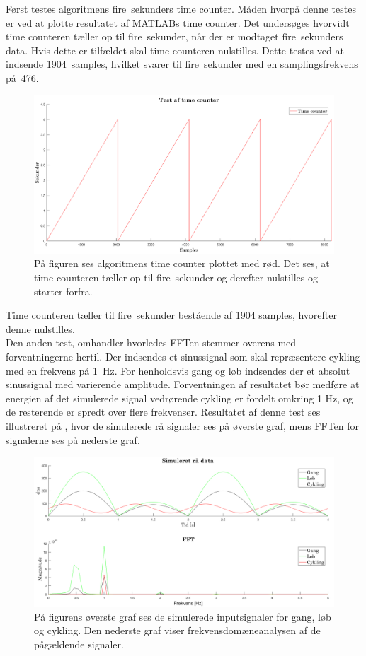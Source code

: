 Først testes algoritmens fire~sekunders time counter. Måden hvorpå denne testes er ved at plotte resultatet af MATLABs time counter. Det undersøges hvorvidt time counteren tæller op til fire~sekunder, når der er modtaget fire~sekunders data. Hvis dette er tilfældet skal time counteren nulstilles. Dette testes ved at indsende 1904~samples, hvilket svarer til fire~sekunder med en samplingsfrekvens på~476.  
\begin{figure}[H]
	\centering
	\includegraphics[width=.7\textwidth]{figures/cDesign/sim_counter.png}
	\caption{På figuren ses algoritmens time counter plottet med rød. Det ses, at time counteren tæller op til fire~sekunder og derefter nulstilles og starter forfra.}
	\label{fig:sim_count}
\end{figure}\vspace{-.25cm}
Time counteren tæller til fire~sekunder bestående af 1904 samples, hvorefter denne nulstilles.\\
Den anden test, omhandler hvorledes FFTen stemmer overens med forventningerne hertil. Der indsendes et sinussignal som skal repræsentere cykling med en frekvens på 1~Hz. For henholdsvis gang og løb indsendes der et absolut sinussignal med varierende amplitude. Forventningen af resultatet bør medføre at energien af det simulerede signal vedrørende cykling er fordelt omkring 1 Hz, og de resterende er spredt over flere frekvenser. Resultatet af denne test ses illustreret på , hvor de simulerede rå signaler ses på øverste graf, mens FFTen for signalerne ses på nederste graf.
\begin{figure}[H]
	\centering
	\includegraphics[width=.75\textwidth]{figures/cDesign/sim_gyro.png}
	\caption{På figurens øverste graf ses de simulerede inputsignaler for gang, løb og cykling. Den nederste graf viser frekvensdomæneanalysen af de pågældende signaler.}
	\label{fig:sim_gyro}
\end{figure}\vspace{-.25cm}
